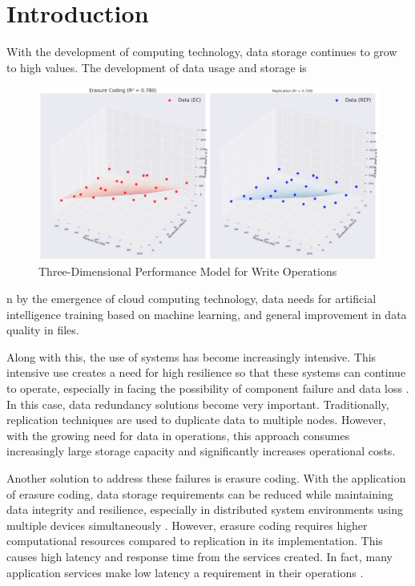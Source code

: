 \section{Introduction}

With the development of computing technology, data storage continues to grow to high values. The development of data usage and storage is\begin{figure}[ht]
    \centering
    \includegraphics[width=\columnwidth]{resources/chapter-4/write_bigload_avgnet_regression.png}
    \caption{Three-Dimensional Performance Model for Write Operations}
    \label{fig:write-regression-model}
\end{figure}n by the emergence of cloud computing technology, data needs for artificial intelligence training based on machine learning, and general improvement in data quality in files.

Along with this, the use of systems has become increasingly intensive. This intensive use creates a need for high resilience so that these systems can continue to operate, especially in facing the possibility of component failure and data loss \cite{weatherspoon2002erasure}. In this case, data redundancy solutions become very important. Traditionally, replication techniques are used to duplicate data to multiple nodes. However, with the growing need for data in operations, this approach consumes increasingly large storage capacity and significantly increases operational costs.

Another solution to address these failures is erasure coding. With the application of erasure coding, data storage requirements can be reduced while maintaining data integrity and resilience, especially in distributed system environments using multiple devices simultaneously \cite{balaji2018erasure}. However, erasure coding requires higher computational resources compared to replication in its implementation. This causes high latency and response time from the services created. In fact, many application services make low latency a requirement in their operations \cite{dean2013tail}.

